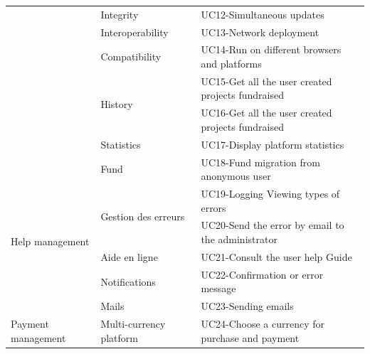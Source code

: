 \begin{longtable}{|m{10em}|m{10em}|m{10em}|}
                                           & \multirow{1}{*}{Integrity}               & UC12-Simultaneous updates                                       \\\cline{2-3}
                                           & \multirow{1}{*}{Interoperability}        & UC13-Network deployment                                         \\\cline{2-3}
                                           & \multirow{1}{*}{Compatibility}           & UC14-Run on different browsers and platforms                    \\\cline{2-3}
                                           & \multirow{2}{*}{History}                 & UC15-Get all the user created projects fundraised               \\\cline{3-3}
                                           &                                          & UC16-Get all the user created projects fundraised               \\\cline{2-3}
                                           & \multirow{1}{*}{Statistics}              & UC17-Display platform statistics                                \\\cline{2-3}
                                           & \multirow{1}{*}{Fund}                    & UC18-Fund migration from anonymous user                         \\\hline
      \multirow{4}{*}{Help management}     & \multirow{2}{*}{Gestion des erreurs}     & UC19-Logging Viewing types of errors                            \\\cline{3-3}
                                           &                                          & UC20-Send the error by email to the administrator               \\\cline{2-3}
                                           & \multirow{1}{*}{Aide en ligne}           & UC21-Consult the user help Guide                                \\\cline{2-3}
                                           & \multirow{1}{*}{Notifications}           & UC22-Confirmation or error message                              \\\cline{2-3}
                                           & \multirow{1}{*}{Mails}                   & UC23-Sending emails                                             \\\hline
      \multirow{2}{*}{Payment management}  & \multirow{1}{*}{Multi-currency platform} & UC24-Choose a currency for purchase and payment                 \\\cline{2-3}

\end{longtable}

